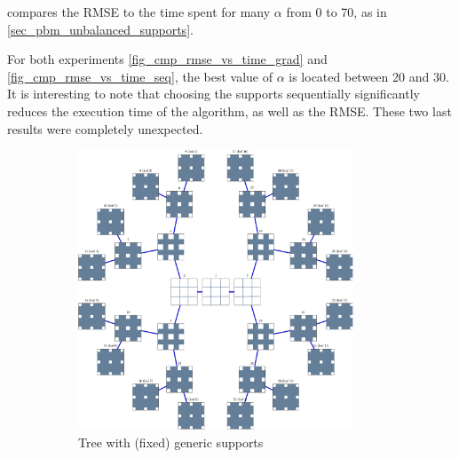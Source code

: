\noindent
{} compares the RMSE to the time spent for many $\alpha$ from 0 to 70, as in \cref{sec_pbm_unbalanced_supports}. 

\noindent
For both experiments \cref{fig_cmp_rmse_vs_time_grad} and \cref{fig_cmp_rmse_vs_time_seq}, the best value of $\alpha$ is located between 20 and 30. It is interesting to note that choosing the supports sequentially significantly reduces the execution time of the algorithm, as well as the RMSE. These two last results were completely unexpected.

\begin{figure}[!h] \centering
\begin{subfigure}[b]{0.49\textwidth}\centering
\includegraphics[width=0.9\textwidth]{figures/tree-learn/xp_learnsupp256_curvelet_decomp3[tree-binary_dpth4]_supp-generic3x3_[fixed-supports]_tree.pdf}
	\caption{Tree with (fixed) generic supports}
\end{subfigure}
\begin{subfigure}[b]{0.49\textwidth}\centering

\end{subfigure}
\end{figure}
